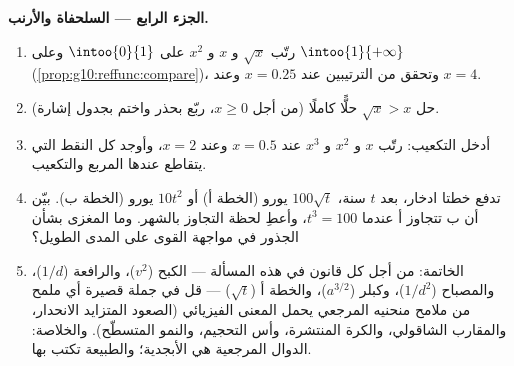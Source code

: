 \begin{problem}
\medskip
\noindent\textbf{الجزء الرابع --- السلحفاة والأرنب.}
\begin{enumerate}[resume]
  \item رتّب $\sqrt x$ و $x$ و $x^2$ على $\intoo{0}{1}$ وعلى
        $\intoo{1}{+\infty}$
        (\cref{prop:g10:reffunc:compare})، وتحقق من الترتيبين
        عند $x = 0.25$ وعند $x = 4$.
  \item حل $\sqrt x > x$ حلًّا كاملًا (من أجل $x \geq 0$، ربّع
        بحذر واختم بجدول إشارة).
  \item أدخل التكعيب: رتّب $x$ و $x^2$ و $x^3$ عند
        $x = 0.5$ وعند $x = 2$، وأوجد كل النقط التي يتقاطع
        عندها المربع والتكعيب.
  \item تدفع خطتا ادخار، بعد $t$ سنة، $100\sqrt t$
        يورو (الخطة أ) أو $10 t^2$ يورو (الخطة ب). بيّن أن
        ب تتجاوز أ عندما $t^3 = 100$، وأعطِ لحظة التجاوز
        بالشهر. وما المغزى بشأن الجذور في مواجهة القوى على
        المدى الطويل؟
  \item الخاتمة: من أجل كل قانون في هذه المسألة --- الكبح
        ($v^2$)، والرافعة ($1/d$)، والمصباح ($1/d^2$)، وكبلر
        ($a^{3/2}$)، والخطة أ ($\sqrt t$) --- قل في جملة قصيرة
        أي ملمح من ملامح منحنيه المرجعي يحمل المعنى
        الفيزيائي (الصعود المتزايد الانحدار، والمقارب الشاقولي،
        والكرة المنتشرة، وأس التحجيم، والنمو المتسطّح).
        والخلاصة: الدوال المرجعية هي الأبجدية؛ والطبيعة تكتب بها.
\end{enumerate}
\end{problem}
